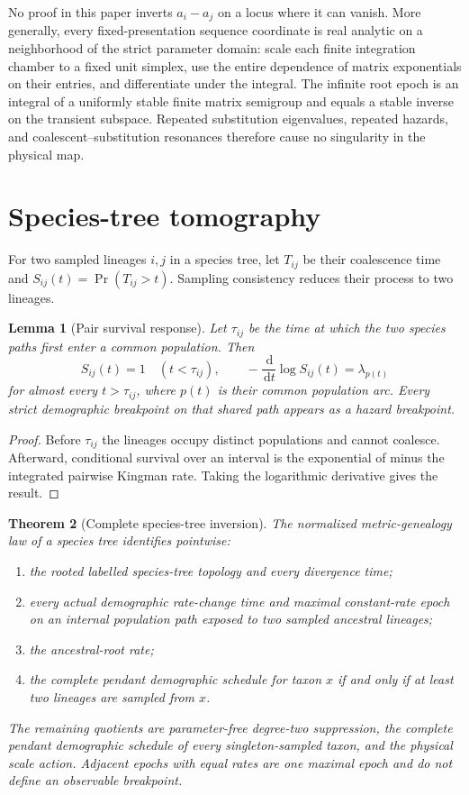 \documentclass[11pt]{article}
\newtheorem{theorem}{Theorem}[section]
\newtheorem{lemma}[theorem]{Lemma}
\newcommand{\dd}{\,\mathrm d}
\begin{document}
No proof in this paper inverts $a_i-a_j$ on a locus where it can vanish.  More generally, every fixed-presentation sequence coordinate is real analytic on a neighborhood of the strict parameter domain: scale each finite integration chamber to a fixed unit simplex, use the entire dependence of matrix exponentials on their entries, and differentiate under the integral.  The infinite root epoch is an integral of a uniformly stable finite matrix semigroup and equals a stable inverse on the transient subspace.  Repeated substitution eigenvalues, repeated hazards, and coalescent--substitution resonances therefore cause no singularity in the physical map.

\section{Species-tree tomography}
\label{sec:trees}

For two sampled lineages $i,j$ in a species tree, let $T_{ij}$ be their coalescence time and $S_{ij}(t)=\Pr(T_{ij}>t)$.  Sampling consistency reduces their process to two lineages.

\begin{lemma}[Pair survival response]
\label{lem:tree-survival}
Let $\tau_{ij}$ be the time at which the two species paths first enter a common population.  Then
\[
S_{ij}(t)=1\quad(t<\tau_{ij}),
\qquad
-\frac{\dd}{\dd t}\log S_{ij}(t)=\lambda_{p(t)}
\]
for almost every $t>\tau_{ij}$, where $p(t)$ is their common population arc.  Every strict demographic breakpoint on that shared path appears as a hazard breakpoint.
\end{lemma}

\begin{proof}
Before $\tau_{ij}$ the lineages occupy distinct populations and cannot coalesce.  Afterward, conditional survival over an interval is the exponential of minus the integrated pairwise Kingman rate.  Taking the logarithmic derivative gives the result.
\end{proof}

\begin{theorem}[Complete species-tree inversion]
\label{thm:tree-inversion}
The normalized metric-genealogy law of a species tree identifies pointwise:
\begin{enumerate}[label=(\roman*)]
\item the rooted labelled species-tree topology and every divergence time;
\item every actual demographic rate-change time and maximal constant-rate epoch on an internal population path exposed to two sampled ancestral lineages;
\item the ancestral-root rate;
\item the complete pendant demographic schedule for taxon $x$ if and only if at least two lineages are sampled from $x$.
\end{enumerate}
The remaining quotients are parameter-free degree-two suppression, the complete pendant demographic schedule of every singleton-sampled taxon, and the physical scale action.  Adjacent epochs with equal rates are one maximal epoch and do not define an observable breakpoint.
\end{theorem}
\end{document}
